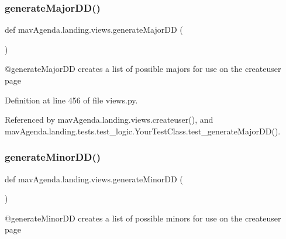 \mbox{\label{namespacemavAgenda_1_1landing_1_1views_ab60f609329a57c41030685c032249fbb}} 
\subsubsection{\texorpdfstring{generate\+Major\+D\+D()}{generateMajorDD()}}
{\footnotesize\ttfamily def mav\+Agenda.\+landing.\+views.\+generate\+Major\+DD (\begin{DoxyParamCaption}{ }\end{DoxyParamCaption})}

\begin{DoxyVerb}@generateMajorDD creates a list of possible majors for use on the createuser page
\end{DoxyVerb}
 

Definition at line 456 of file views.\+py.



Referenced by mav\+Agenda.\+landing.\+views.\+createuser(), and mav\+Agenda.\+landing.\+tests.\+test\+\_\+logic.\+Your\+Test\+Class.\+test\+\_\+generate\+Major\+D\+D().

\mbox{\label{namespacemavAgenda_1_1landing_1_1views_aeefa9826cec239552cb7620c54e76450}} 
\subsubsection{\texorpdfstring{generate\+Minor\+D\+D()}{generateMinorDD()}}
{\footnotesize\ttfamily def mav\+Agenda.\+landing.\+views.\+generate\+Minor\+DD (\begin{DoxyParamCaption}{ }\end{DoxyParamCaption})}

\begin{DoxyVerb}@generateMinorDD creates a list of possible minors for use on the createuser page
\end{DoxyVerb}
 


